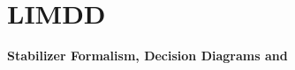 \section{LIMDD}


\begin{frame}
\begin{refsection}

\vfill
	
	\centering
	\textbf{\Large Stabilizer Formalism, Decision Diagrams and \limdd~\cite{vinkhuijzen2021limdd}}
	
	
\vfill

\printbibliography[section=\therefsection]
\end{refsection}

\end{frame}




